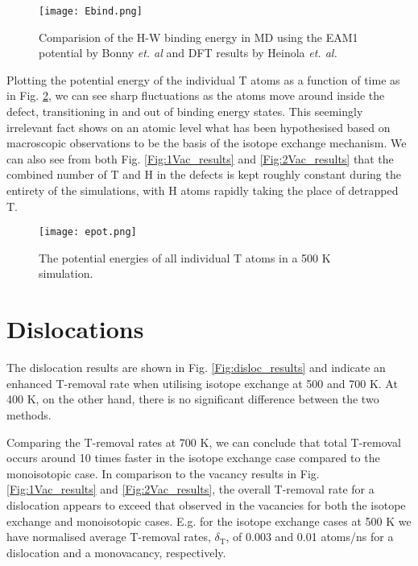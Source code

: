 \begin{figure}[!ht]
	\center
	\texttt{[image: Ebind.png]}
	\caption{Comparision of the H-W binding energy in MD using the EAM1 potential by Bonny \textit{et. al} and DFT results by Heinola \textit{et. al. }\cite{heinolaTungstenDFT}}
	\label{Fig:Ebind1H_DFT}
\end{figure}

Plotting the potential energy of the individual T atoms as a function of time as in Fig. \ref{Fig:Epot}, we can see sharp fluctuations as the atoms move around inside the defect, transitioning in and out of binding energy states.
This seemingly irrelevant fact shows on an atomic level what has been hypothesised based on macroscopic observations to be the basis of the isotope exchange mechanism.
We can also see from both Fig. \ref{Fig:1Vac_results} and \ref{Fig:2Vac_results} that the combined number of T and H in the defects is kept roughly constant during the entirety of the simulations, with H atoms rapidly taking the place of detrapped T.

\begin{figure}[!ht]
	\center
	\texttt{[image: epot.png]}
	\caption{The potential energies of all individual T atoms in a 500 K simulation.\vspace*{6mm}}
	\label{Fig:Epot}
\end{figure}


\section{Dislocations}
The dislocation results are shown in Fig. \ref{Fig:disloc_results} and indicate an enhanced T-removal rate when utilising isotope exchange at 500 and 700 K. 
At 400 K, on the other hand, there is no significant difference between the two methods.

Comparing the T-removal rates at 700 K, we can conclude that total T-removal occurs around 10 times faster in the isotope exchange case compared to the monoisotopic case.
In comparison to the vacancy results in Fig. \ref{Fig:1Vac_results} and \ref{Fig:2Vac_results}, the overall T-removal rate for a dislocation appears to exceed that observed in the vacancies for both the isotope exchange and monoisotopic cases.
E.g. for the isotope exchange cases at 500 K we have normalised average T-removal rates, $\delta_{\text{T}}$, of 0.003 and 0.01 atoms/ns for a dislocation and a monovacancy, respectively.

